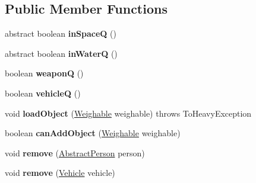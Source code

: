 \subsection*{Public Member Functions}
\begin{DoxyCompactItemize}
\item 
abstract boolean {\bfseries in\+SpaceQ} ()\hypertarget{classtools_1_1vehicles_1_1_vehicle_aac8cb1ada09c2c7341de44f3028b23a4}{}\label{classtools_1_1vehicles_1_1_vehicle_aac8cb1ada09c2c7341de44f3028b23a4}

\item 
abstract boolean {\bfseries in\+WaterQ} ()\hypertarget{classtools_1_1vehicles_1_1_vehicle_aa81ec38679d30de7cccd726789fc1219}{}\label{classtools_1_1vehicles_1_1_vehicle_aa81ec38679d30de7cccd726789fc1219}

\item 
boolean {\bfseries weaponQ} ()\hypertarget{classtools_1_1vehicles_1_1_vehicle_aae18c62f2cc65b2b08801977570cebf4}{}\label{classtools_1_1vehicles_1_1_vehicle_aae18c62f2cc65b2b08801977570cebf4}

\item 
boolean {\bfseries vehicleQ} ()\hypertarget{classtools_1_1vehicles_1_1_vehicle_aec684e1097d2993c9b8c540fe24ecfd9}{}\label{classtools_1_1vehicles_1_1_vehicle_aec684e1097d2993c9b8c540fe24ecfd9}

\item 
void {\bfseries load\+Object} (\hyperlink{interfacetools_1_1vehicles_1_1_weighable}{Weighable} weighable)  throws To\+Heavy\+Exception \hypertarget{classtools_1_1vehicles_1_1_vehicle_a3f632c1edde46f2af4aa2f5efb74fbd4}{}\label{classtools_1_1vehicles_1_1_vehicle_a3f632c1edde46f2af4aa2f5efb74fbd4}

\item 
boolean {\bfseries can\+Add\+Object} (\hyperlink{interfacetools_1_1vehicles_1_1_weighable}{Weighable} weighable)\hypertarget{classtools_1_1vehicles_1_1_vehicle_a5fb22780163546c117bcdcb256bda38a}{}\label{classtools_1_1vehicles_1_1_vehicle_a5fb22780163546c117bcdcb256bda38a}

\item 
void {\bfseries remove} (\hyperlink{classpeople_1_1_abstract_person}{Abstract\+Person} person)\hypertarget{classtools_1_1vehicles_1_1_vehicle_a6e1e9bf3eb507dc72ff821ccd0e233f0}{}\label{classtools_1_1vehicles_1_1_vehicle_a6e1e9bf3eb507dc72ff821ccd0e233f0}

\item 
void {\bfseries remove} (\hyperlink{classtools_1_1vehicles_1_1_vehicle}{Vehicle} vehicle)\hypertarget{classtools_1_1vehicles_1_1_vehicle_a60b4130a0f26e3d230963eafc5dedf29}{}\label{classtools_1_1vehicles_1_1_vehicle_a60b4130a0f26e3d230963eafc5dedf29}


\end{DoxyCompactItemize}
